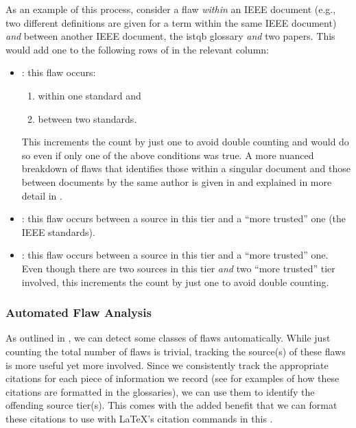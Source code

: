 \label{flaw-analysis-example}
As an example of this process, consider a flaw \emph{within} an IEEE
document (e.g., two different definitions are given for a term within the same
IEEE document) \emph{and} between another IEEE document, the \acs{istqb}
glossary \emph{and} two papers. This would add one to the following rows of
 in the relevant column:

\begin{itemize}
    \item \textbf{\stds{}}: this flaw occurs:
          \begin{enumerate}
              \item within one standard and
              \item between two standards.
          \end{enumerate}
          This increments the count by just one to avoid double counting and
          would do so even if only one of the above conditions was true. A more
          nuanced breakdown of flaws that identifies those within a
          singular document and those between documents by the same author is
          given in  and explained in more detail in
          .
    \item \textbf{\metas{}}: this flaw occurs between a source in this tier and
          a ``more trusted'' one (the IEEE standards).
    \item \textbf{\papers{}}: this flaw occurs between a source in this tier
          and a ``more trusted'' one. Even though there are two sources in this
          tier \emph{and} two ``more trusted'' tier involved, this increments
          the count by just one to avoid double counting.
\end{itemize}

\subsubsection{Automated Flaw Analysis}
\label{auto-flaw-analysis}

As outlined in , we can detect some classes of flaws
automatically. While just counting the total number of flaws is trivial,
tracking the source(s) of these flaws is more useful yet more involved. Since
we consistently track the appropriate citations for each piece of information
we record (see  for examples
of how these citations are formatted in the glossaries), we can use them to
identify the offending source tier(s). This comes with the added benefit that
we can format these citations to use with \LaTeX{}'s citation commands in this
\docType{}.

